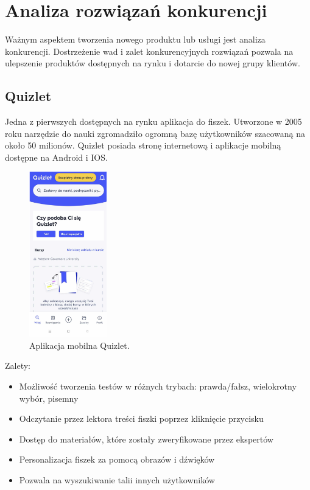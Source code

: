 \section{Analiza rozwiązań konkurencji}

Ważnym aspektem tworzenia nowego produktu lub usługi jest analiza konkurencji. Dostrzeżenie wad i zalet konkurencyjnych rozwiązań pozwala na ulepszenie produktów dostępnych na rynku i dotarcie do nowej grupy klientów.

\subsection{Quizlet}


Jedna z pierwszych dostępnych na rynku aplikacja do fiszek. Utworzone w 2005 roku narzędzie do nauki zgromadziło ogromną bazę użytkowników szacowaną na około 50 milionów. Quizlet posiada stronę internetową i aplikacje mobilną dostępne na Android i IOS.

\begin{figure}[H]
    \centering
    \includegraphics[width=0.3\textwidth]{chapters/chapter_3/quizlet}
    \caption{Aplikacja mobilna Quizlet.}
    \label{img:quizlet}
\end{figure}

Zalety:
\begin{itemize}
    \item Możliwość tworzenia testów w różnych trybach: prawda/fałsz, wielokrotny wybór, pisemny
    \item Odczytanie przez lektora treści fiszki poprzez kliknięcie przycisku
    \item Dostęp do materiałów, które zostały zweryfikowane przez ekspertów
    \item Personalizacja fiszek za pomocą obrazów i dźwięków
    \item Pozwala na wyszukiwanie talii innych użytkowników
\end{itemize}

